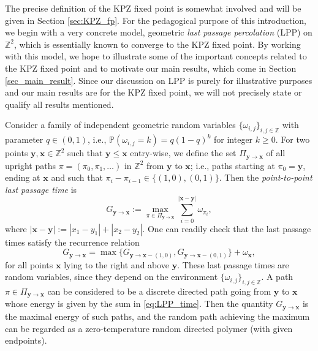 \documentclass[oneside,final,11pt]{amsart}
\theoremstyle{definition}
\newcommand{\Airy}{Airy$_2$~}
\newcommand{\zz}{\mathbb{Z}}
\newcommand{\1}[1]{\mathbf{1}_{#1}}
\newcommand{\bx}{\mathbf{x}}
\newcommand{\by}{\mathbf{y}}
\renewcommand{\P}{\mathbb P}
\numberwithin{equation}{section}
\begin{document}

The precise definition of the KPZ fixed point is somewhat involved and will be given in Section \ref{sec:KPZ_fp}. For the pedagogical purpose of this introduction, we begin with a very concrete model, geometric \emph{last passage percolation} (LPP) on $\zz^2$, which is essentially known to converge to the KPZ fixed point. By working with this model, we hope to illustrate some of the important concepts related to the KPZ fixed point and to motivate our main results, which come in Section \ref{sec_main_result}. Since our discussion on LPP is purely for illustrative purposes and our main results are for the KPZ fixed point, we will not precisely state or qualify all results mentioned.

\medskip
Consider a family of independent geometric random variables $\{\omega_{i,j}\}_{i,j \in \zz}$ with parameter $q \in (0,1)$, i.e., $\P(\omega_{i,j} = k) = q(1-q)^k$ for integer $k \geq 0$. For two points $\by, \bx \in \zz^2$ such that $\by \leq \bx$ entry-wise, we define the set $\Pi_{\by \to \bx}$ of all upright paths $\pi = (\pi_0, \pi_1, \ldots)$ in $\zz^2$ from $\by$ to $\bx$; i.e., paths starting at $\pi_0 = \by$, ending at $\bx$ and such that $\pi_i - \pi_{i-1} \in \{(1,0), (0,1)\}$. Then the \emph{point-to-point last passage time} is
\begin{equation}\label{eq:LPP_time}
G_{\by \to \bx} := \max_{\pi \in \Pi_{\by \to \bx}} \sum_{i = 0}^{|\bx - \by|} \omega_{\pi_i},
\end{equation}
where $|\bx - \by| := |x_1 - y_1| + |x_2 - y_2|$. One can readily check that the last passage times satisfy the recurrence relation
\begin{equation}
G_{\by \to \bx} = \max \bigl\{G_{\by \to \bx - (1,0)}, G_{\by \to \bx - (0,1)}\bigr\} + \omega_{\bx},
\end{equation}
for all points $\bx$ lying to the right and above $\by$. These last passage times are random variables, since they depend on the environment $\{\omega_{i,j}\}_{i,j \in \zz}$. A path $\pi \in \Pi_{\by \to \bx}$ can be considered to be a discrete directed path going from $\by$ to $\bx$ whose energy is given by the sum in \eqref{eq:LPP_time}. Then the quantity $G_{\by \to \bx}$ is the maximal energy of such paths, and the random path achieving the maximum can be regarded as a zero-temperature random directed polymer (with given endpoints).
\end{document}
